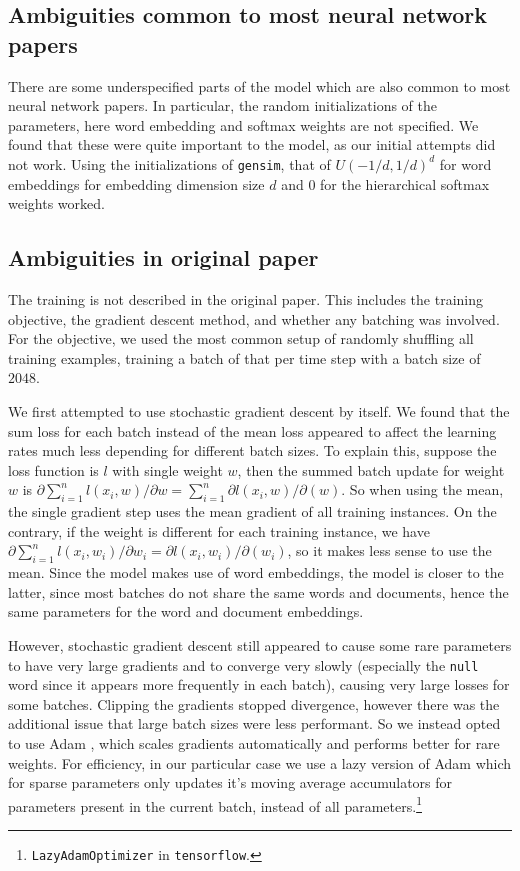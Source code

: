 \documentclass{article}
\begin{document}
\subsection{Ambiguities common to most neural network papers}
There are some underspecified parts of the model which are also common to most neural network papers. In particular, the random initializations of the parameters, here word embedding and softmax weights are not specified. We found that these were quite important to the model, as our initial attempts did not work. Using the initializations of \texttt{gensim}, that of $U(-1/d, 1/d)^d$ for word embeddings for embedding dimension size $d$ and $0$ for the hierarchical softmax weights worked.

\subsection{Ambiguities in original paper}
The training is not described in the original paper. This includes the training objective, the gradient descent method, and whether any batching was involved. For the objective, we used the most common setup of randomly shuffling all training examples, training a batch of that per time step with a batch size of $2048$.

We first attempted to use stochastic gradient descent by itself. We found that the sum loss for each batch instead of the mean loss appeared to affect the learning rates much less depending for different batch sizes. To explain this, suppose the loss function is $l$ with single weight $w$, then the summed batch update for weight $w$ is $\partial\sum_{i=1}^n l(x_i, w) / \partial{w} = \sum_{i=1}^n \partial l(x_i, w)/\partial(w)$. So when using the mean, the single gradient step uses the mean gradient of all training instances. On the contrary, if the weight is different for each training instance, we have $\partial\sum_{i=1}^n l(x_i, w_i) / \partial{w_i} = \partial l(x_i, w_i)/\partial(w_i)$, so it makes less sense to use the mean. Since the model makes use of word embeddings, the model is closer to the latter, since most batches do not share the same words and documents, hence the same parameters for the word and document embeddings.

However, stochastic gradient descent still appeared to cause some rare parameters to have very large gradients and to converge very slowly (especially the \texttt{null} word since it appears more frequently in each batch), causing very large losses for some batches. Clipping the gradients stopped divergence, however there was the additional issue that large batch sizes were less performant. So we instead opted to use Adam \citep{kingma_adam:_2014}, which scales gradients automatically and performs better for rare weights. For efficiency, in our particular case we use a lazy version of Adam which for sparse parameters only updates it's moving average accumulators for parameters present in the current batch, instead of all parameters.\footnote{\texttt{LazyAdamOptimizer} in \texttt{tensorflow}.}
\end{document}
